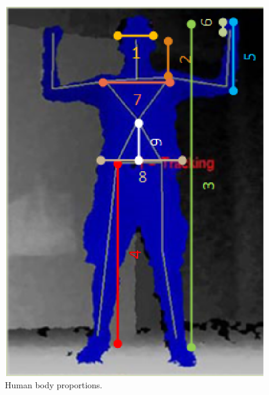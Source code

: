 \documentclass[number,preprint,review,12pt]{elsarticle}
\begin{document}
\begin{figure}
	\begin{center}
			\includegraphics[width=0.70\columnwidth]{./figures/body_proportions.eps}
	\end{center}
	\caption{Human body proportions.}
	\label{fig:body_proportions}
\end{figure}
\end{document}
